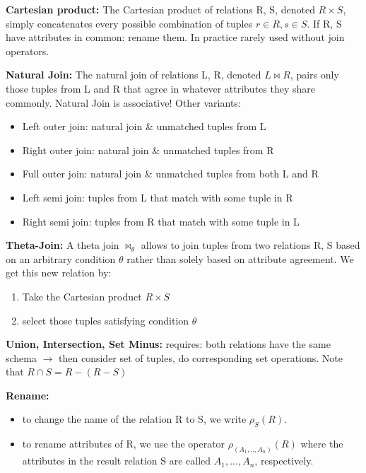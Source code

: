 \documentclass[11pt,oneside,a4paper]{article}
\begin{document}
\textbf{Cartesian product:} The Cartesian product of relations R, S, denoted $R \times S$, simply concatenates every possible combination of tuples $r \in R, s \in S$. If R, S have attributes in common: rename them. In practice rarely used without join operators.

\textbf{Natural Join:} The natural join of relations L, R, denoted $L \bowtie R$, pairs only those tuples from L and R that agree in whatever attributes they share commonly. Natural Join is associative!
Other variants:

\vspace{-\topsep}
\begin{itemize}
	\setlength{\itemsep}{0pt}
	\setlength{\parskip}{0pt}
	\item Left outer join: natural join \& unmatched tuples from L
	\item Right outer join: natural join \& unmatched tuples from R
	\item Full outer join: natural join \& unmatched tuples from both L and R
	\item Left semi join: tuples from L that match with some tuple in R
	\item Right semi join: tuples from R that match with some tuple in L
\end{itemize}
\vspace{-\topsep}

\textbf{Theta-Join:} A theta join $\bowtie_\theta$ allows to join tuples from two relations R, S based on an arbitrary condition $\theta$ rather than solely based on attribute agreement. We get this new relation by:

\vspace{-\topsep}
\begin{enumerate}
	\setlength{\itemsep}{0pt}
	\setlength{\parskip}{0pt}
	\item Take the Cartesian product $R \times S$
	\item select those tuples satisfying condition $\theta$
\end{enumerate}
\vspace{-\topsep}

\textbf{Union, Intersection, Set Minus:} requires: both relations have the same schema $\rightarrow$ then consider set of tuples, do corresponding set operations. Note that $R \cap S = R - (R - S)$

\textbf{Rename:} 

\vspace{-\topsep}
\begin{itemize}
	\setlength{\itemsep}{0pt}
	\setlength{\parskip}{0pt}
	\item to change the name of the relation R to S, we write $\rho_S(R)$. 
	\item to rename attributes of R, we use the operator $\rho_{(A_1,..,A_n)}(R)$ where the attributes in the result relation S are called $A_1,...,A_n$, respectively.
\end{itemize}
\vspace{-\topsep}
\end{document}
